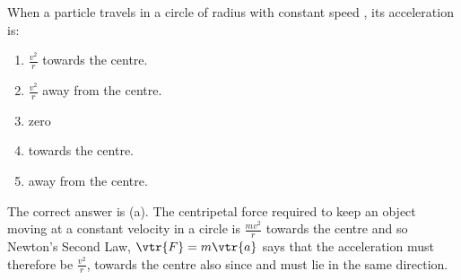 \begin{problem}[AO1989PIQ10l] 
{When a particle travels in a circle of radius  with constant speed , its acceleration is:
\begin{enumerate}
	\item $\frac{v^{2}}{r}$ towards the centre. \answer
	\item $\frac{v^{2}}{r}$ away from the centre.
	\item zero
	\item {} towards the centre.
	\item {} away from the centre.
\end{enumerate}
}
{}
{The correct answer is (a). The centripetal force required to keep an object moving at a constant velocity in a circle is $\frac{mv^{2}}{r}$ towards the centre and so Newton's Second Law, $\vtr{F}=m\vtr{a}$ says that the acceleration must therefore be $\frac{v^{2}}{r}$, towards the centre also since  and  must lie in the same direction.}
\end{problem}